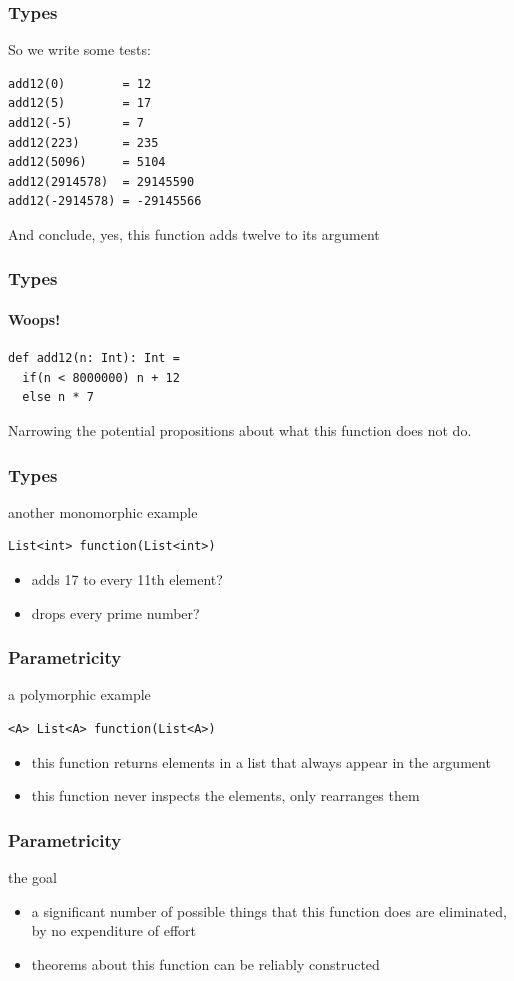 \begin{frame}[fragile]
\frametitle{Types}
So we write some tests:
\begin{lstlisting}
add12(0)        = 12
add12(5)        = 17
add12(-5)       = 7
add12(223)      = 235
add12(5096)     = 5104
add12(2914578)  = 29145590
add12(-2914578) = -29145566
\end{lstlisting}
And conclude, yes, this function adds twelve to its argument
\end{frame}

\begin{frame}[fragile]
\frametitle{Types}
\framesubtitle{Woops!}
\begin{lstlisting}
def add12(n: Int): Int =
  if(n < 8000000) n + 12
  else n * 7
\end{lstlisting}
Narrowing the potential propositions about what this function does not do.
\end{frame}

\begin{frame}[fragile]
\frametitle{Types}
\begin{block}{another monomorphic example}
\begin{lstlisting}
List<int> function(List<int>)
\end{lstlisting}
\end{block}
\begin{itemize}
  \item<1> adds 17 to every 11th element?
  \item<2> drops every prime number?
\end{itemize}
\end{frame}

\begin{frame}[fragile]
\frametitle{Parametricity}
\begin{block}{a polymorphic example}
\begin{lstlisting}
<A> List<A> function(List<A>)
\end{lstlisting}
\end{block}
\begin{itemize}
  \item<1> this function returns elements in a list that always appear in the argument
  \item<2> this function never inspects the elements, only rearranges them
\end{itemize}
\end{frame}

\begin{frame}[fragile]
\frametitle{Parametricity}
\begin{block}{the goal}
\begin{itemize}
  \item<1> a significant number of possible things that this function does are eliminated, by no expenditure of effort
  \item<2> theorems about this function can be reliably constructed
\end{itemize}
\end{block}
\end{frame}

